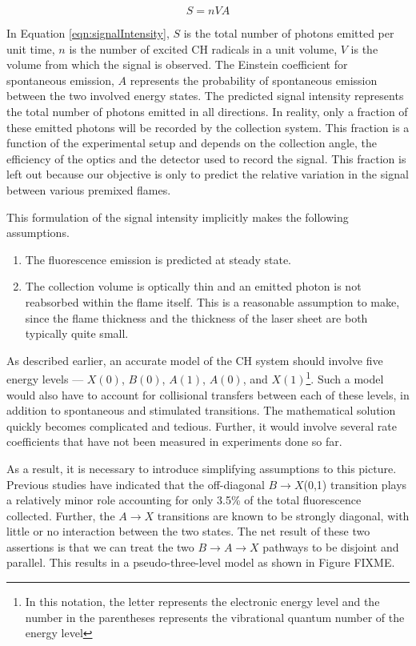 \begin{equation}
S=nVA
\label{eqn:signalIntensity}
\end{equation}

In Equation \ref{eqn:signalIntensity}, \(S\) is the total number of photons emitted per unit time, \(n\) is the number of excited CH radicals in a unit volume, \(V\) is the volume from which the signal is observed.
The Einstein coefficient for spontaneous emission, \(A\) represents the probability of spontaneous emission between the two involved energy states.
The predicted signal intensity represents the total number of photons emitted in all directions.
In reality, only a fraction of these emitted photons will be recorded by the collection system.
This fraction is a function of the experimental setup and depends on the collection angle, the efficiency of the optics and the detector used to record the signal.
This fraction is left out because our objective is only to predict the relative variation in the signal between various premixed flames.

This formulation of the signal intensity implicitly makes the following assumptions.
\begin{enumerate}
\item The fluorescence emission is predicted at steady state.
\item The collection volume is optically thin and an emitted photon is not reabsorbed within the flame itself.
This is a reasonable assumption to make, since the flame thickness and the thickness of the laser sheet are both typically quite small.
\end{enumerate}

As described earlier, an accurate model of the CH system should involve five energy levels --- \(X(0)\), \(B(0)\), \(A(1)\), \(A(0)\), and \(X(1)\)\footnote{In this notation, the letter represents the electronic energy level and the number in the parentheses represents the vibrational quantum number of the energy level}.
Such a model would also have to account for collisional transfers between each of these levels, in addition to spontaneous and stimulated transitions.
The mathematical solution quickly becomes complicated and tedious.
Further, it would involve several rate coefficients that have not been measured in experiments done so far.

As a result, it is necessary to introduce simplifying assumptions to this picture.
Previous studies\cite{2000-luque,1996-luque-c} have indicated that the off-diagonal \(B\rightarrow X\)(0,1) transition plays a relatively minor role accounting for only 3.5\% of the total fluorescence collected.
Further, the \(A\rightarrow X\) transitions are known to be strongly diagonal, with little or no interaction\cite{1985-garland-b} between the two states.
The net result of these two assertions is that we can treat the two \(B\rightarrow A\rightarrow X\) pathways to be disjoint and parallel.
This results in a pseudo-three-level model as shown in Figure FIXME.

